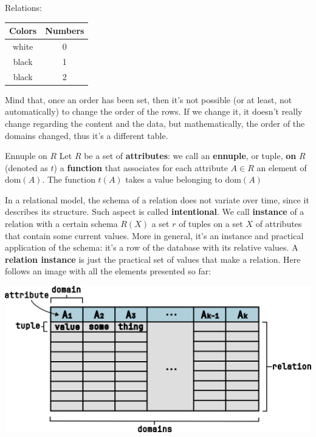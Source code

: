 \begin{center}
    Relations: 
    \begin{tabular}{|c|c|}
        \hline \rowcolor{maindoccol!60}
        \textbf{Colors} & \textbf{Numbers} \\
        \hline
        white & 0 \\
        \hline
        black & 1 \\
        \hline
        black & 2 \\
        \hline
    \end{tabular}
\end{center}

Mind that, once an order has been set, then it's not possible (or at least, not automatically) to change the order of the rows. If we change it, it doesn't really change regarding the content and the data, but mathematically, the order of the domains changed, thus it's a different table.

\begin{definition}{Ennuple on $R$}
    Let $R$ be a set of \textbf{attributes}: we call an \textbf{ennuple}, or tuple, \textbf{on} $R$ (denoted as $t$) a \textbf{function} that associates for each attribute $A \in R$ an element of $\text{dom}(A)$. The function $t(A)$ takes a value belonging to $\text{dom}(A)$ 
\end{definition}

In a relational model, the schema of a relation does not variate over time, since it describes its structure. Such aspect is called \textbf{intentional}.
\nwl
We call \textbf{instance} of a relation with a certain schema $R(X)$ a set $r$ of tuples on a set $X$ of attributes that contain some current values. More in general, it's an instance and practical application of the schema: it's a row of the database with its relative values. A \textbf{relation instance} is just the practical set of values that make a relation. Here follows an image with all the elements presented so far:

\begin{center}
    \includegraphics[scale = 0.30]{assets/images/DBElements.png}
\end{center}

